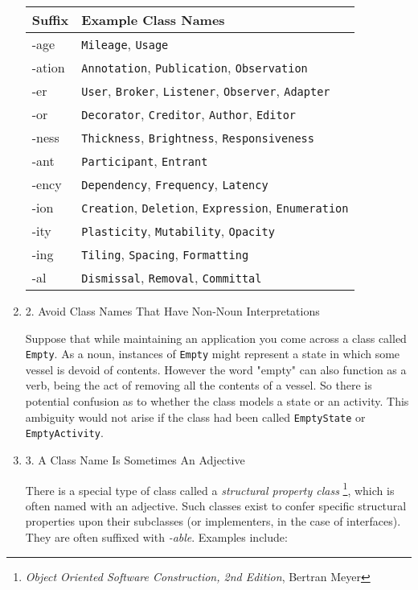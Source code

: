\documentclass{article}
\begin{document}
\begin{enumerate}
\begin{center}
\begin{tabular}{ll}
Suffix & Example Class Names\\
\hline
-age & \texttt{Mileage}, \texttt{Usage}\\
-ation & \texttt{Annotation}, \texttt{Publication}, \texttt{Observation}\\
-er & \texttt{User}, \texttt{Broker}, \texttt{Listener}, \texttt{Observer}, \texttt{Adapter}\\
-or & \texttt{Decorator}, \texttt{Creditor}, \texttt{Author}, \texttt{Editor}\\
-ness & \texttt{Thickness}, \texttt{Brightness}, \texttt{Responsiveness}\\
-ant & \texttt{Participant}, \texttt{Entrant}\\
-ency & \texttt{Dependency}, \texttt{Frequency}, \texttt{Latency}\\
-ion & \texttt{Creation}, \texttt{Deletion}, \texttt{Expression}, \texttt{Enumeration}\\
-ity & \texttt{Plasticity}, \texttt{Mutability}, \texttt{Opacity}\\
-ing & \texttt{Tiling}, \texttt{Spacing}, \texttt{Formatting}\\
-al & \texttt{Dismissal}, \texttt{Removal}, \texttt{Committal}\\
\end{tabular}
\end{center}

\item 2. Avoid Class Names That Have Non-Noun Interpretations
\label{sec:orgheadline265}

Suppose that while maintaining an application you come across a class
called \texttt{Empty}. As a noun, instances of \texttt{Empty} might represent a state
in which some vessel is devoid of contents. However the word "empty" can
also function as a verb, being the act of removing all the contents of a
vessel. So there is potential confusion as to whether the class models a
state or an activity. This ambiguity would not arise if the class had
been called \texttt{EmptyState} or \texttt{EmptyActivity}.

\item 3. A Class Name Is Sometimes An Adjective
\label{sec:orgheadline266}

There is a special type of class called a \emph{structural property
class} \footnote{\emph{Object Oriented Software Construction, 2nd Edition}, Bertran Meyer}, which is often named with an adjective. Such classes exist
to confer specific structural properties upon their subclasses (or
implementers, in the case of interfaces). They are often suffixed with
\emph{-able}. Examples include:


\end{enumerate}
\end{document}
